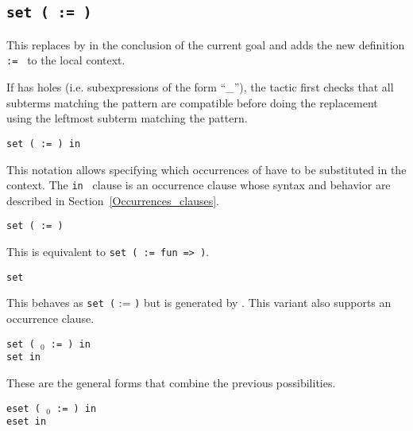 \begin{coq_example*}
\subsection{\tt set ( {\ident} := {\term} )}
\label{tactic:set}

This replaces {\term} by {\ident} in the conclusion of the current goal
and adds the new definition {\tt {\ident} := \term} to the local context.

If {\term} has holes (i.e. subexpressions of the form ``\_''), the
tactic first checks that all subterms matching the pattern are
compatible before doing the replacement using the leftmost subterm
matching the pattern.

\begin{ErrMsgs}
\item {}
\end{ErrMsgs}

\begin{Variants}

\item {\tt set ( {\ident} := {\term} ) in {\occgoalset}}

This notation allows specifying which occurrences of {\term} have to
be substituted in the context. The {\tt in {\occgoalset}} clause is an
occurrence clause whose syntax and behavior are described in
Section~\ref{Occurrences_clauses}.

\item {\tt set ( {\ident} \nelistnosep{\binder} := {\term} )}

  This is equivalent to {\tt set ( {\ident} := fun
  \nelistnosep{\binder} => {\term} )}.

\item {\tt set \term}

  This behaves as {\tt set (} {\ident} := {\term} {\tt )} but {\ident}
  is generated by {\Coq}. This variant also supports an occurrence clause.

\item {\tt set ( {\ident$_0$} \nelistnosep{\binder} := {\term} ) in {\occgoalset}}\\
      {\tt set {\term} in {\occgoalset}}

  These are the general forms that combine the previous possibilities.

\item {\tt eset ( {\ident$_0$} \nelistnosep{\binder} := {\term} ) in {\occgoalset}}\\
      {\tt eset {\term} in {\occgoalset}}


\end{Variants}
\end{coq_example*}
